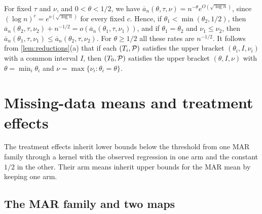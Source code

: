 \begin{remark}\label{rem:combining-rates}
For fixed $\tau$ and $\nu$, and $0<\theta<1/2$, we have
$\overline a_n(\theta,\tau,\nu)=n^{-\theta}e^{O(\sqrt{\log n})}$, since
$(\log n)^c=e^{o(\sqrt{\log n})}$ for every fixed $c$. Hence, if
$\theta_1<\min(\theta_2,1/2)$, then
$\overline a_n(\theta_2,\tau,\nu_2)+n^{-1/2}=o(\overline a_n(\theta_1,\tau,\nu_1))$,
and if $\theta_1=\theta_2$ and $\nu_1\le\nu_2$, then
$\overline a_n(\theta_1,\tau,\nu_1)\le\overline a_n(\theta_2,\tau,\nu_2)$.
For $\theta\ge1/2$ all these rates are $n^{-1/2}$. It follows from
\cref{lem:reductions}(a) that if each $(T_i,\mathcal P)$ satisfies the
upper bracket $(\theta_i,I,\nu_i)$ with a common interval $I$, then
$(T_0,\mathcal P)$ satisfies the upper bracket $(\theta,I,\nu)$ with
$\theta=\min_i\theta_i$ and $\nu=\max\{\nu_i:\theta_i=\theta\}$.
\end{remark}
\chapter{Missing-data means and treatment effects}\label{sec:causal-extension}

The treatment effects inherit lower bounds below the threshold from one
MAR family through a kernel with the observed regression in one arm and
the constant $1/2$ in the other. Their arm means inherit upper bounds
for the MAR mean by keeping one arm.

\section{The MAR family and two maps}\label{sec:binary-embedding}


